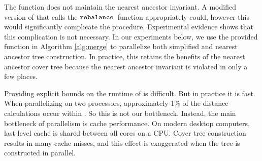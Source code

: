 \documentclass[thesis.tex]{subfiles}
\newcommand{\ctinsert}{\ensuremath{\textnormal{\ttfamily insert}}}
\newcommand{\rebalance}{\ensuremath{\textnormal{\ttfamily rebalance}}}
\begin{document}
The  function does not maintain the nearest ancestor invariant.
A modified version of  that calls the \rebalance~function appropriately could,
however this would significantly complicate the procedure.
Experimental evidence shows that this complication is not necessary.
In our experiments below, we use the provided  function in Algorithm \ref{alg:merge} to parallelize both simplified and nearest ancestor tree construction.
In practice, this retains the benefits of the nearest ancestor cover tree because the nearest ancestor invariant is violated in only a few places.

Providing explicit bounds on the runtime of  is difficult.
But in practice it is fast.
When parallelizing on two processors, approximately 1\% of the distance calculations occur within . %
So this is not our bottleneck.
Instead, the main bottleneck of parallelism is cache performance.
On modern desktop computers, last level cache is shared between all cores on a CPU.
Cover tree construction results in many cache misses,
and this effect is exaggerated when the tree is constructed in parallel.

\end{document}
